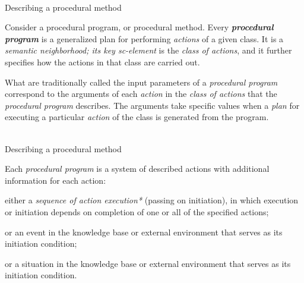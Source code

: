 \begin{frame}{\\Describing a procedural method}
	\topline
	\justifying

    \vspace{0.33cm}

    Consider a procedural program, or procedural method. Every \textbf{\textit{procedural program}} is a generalized plan for performing \textit{actions} of a given class. It is a \textit{semantic neighborhood; its key sc-element\scnrolesign} is the \textit{class of actions}, and it further specifies how the actions in that class are carried out.

    \vspace{0.33cm}

    What are traditionally called the input parameters of a \textit{procedural program} correspond to the arguments of each \textit{action} in the \textit{class of actions} that the \textit{procedural program} describes. The arguments take specific values when a \textit{plan} for executing a particular \textit{action} of the class is generated from the program.
\end{frame}

\begin{frame}{\\Describing a procedural method}
	\topline
	\justifying
    \vspace{0.33cm}

     Each \textit{procedural program} is a system of described actions with additional information for each action:
    \begin{textitemize}
        \item either a \textit{sequence of action execution*} (passing on initiation), in which execution or initiation depends on completion of one or all of the specified actions;
        \item or an event in the knowledge base or external environment that serves as its initiation condition;
        \item or a situation in the knowledge base or external environment that serves as its initiation condition.
    \end{textitemize}
\end{frame}



